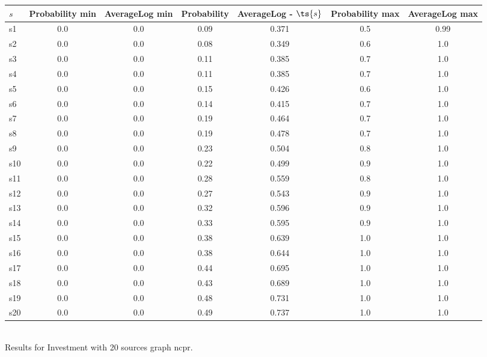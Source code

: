 \documentclass{article}
\begin{document}
\noindent\begin{tabular}{|l|c|c|c|c|c|c|}
\hline
$s$& Probability min & AverageLog min & Probability & AverageLog - $\ts{s}$ & Probability max & AverageLog max\\
\hline
s1 &0.0 & 0.0 & 0.09 & 0.371 & 0.5 & 0.99\\
\hline
s2 &0.0 & 0.0 & 0.08 & 0.349 & 0.6 & 1.0\\
\hline
s3 &0.0 & 0.0 & 0.11 & 0.385 & 0.7 & 1.0\\
\hline
s4 &0.0 & 0.0 & 0.11 & 0.385 & 0.7 & 1.0\\
\hline
s5 &0.0 & 0.0 & 0.15 & 0.426 & 0.6 & 1.0\\
\hline
s6 &0.0 & 0.0 & 0.14 & 0.415 & 0.7 & 1.0\\
\hline
s7 &0.0 & 0.0 & 0.19 & 0.464 & 0.7 & 1.0\\
\hline
s8 &0.0 & 0.0 & 0.19 & 0.478 & 0.7 & 1.0\\
\hline
s9 &0.0 & 0.0 & 0.23 & 0.504 & 0.8 & 1.0\\
\hline
s10 &0.0 & 0.0 & 0.22 & 0.499 & 0.9 & 1.0\\
\hline
s11 &0.0 & 0.0 & 0.28 & 0.559 & 0.8 & 1.0\\
\hline
s12 &0.0 & 0.0 & 0.27 & 0.543 & 0.9 & 1.0\\
\hline
s13 &0.0 & 0.0 & 0.32 & 0.596 & 0.9 & 1.0\\
\hline
s14 &0.0 & 0.0 & 0.33 & 0.595 & 0.9 & 1.0\\
\hline
s15 &0.0 & 0.0 & 0.38 & 0.639 & 1.0 & 1.0\\
\hline
s16 &0.0 & 0.0 & 0.38 & 0.644 & 1.0 & 1.0\\
\hline
s17 &0.0 & 0.0 & 0.44 & 0.695 & 1.0 & 1.0\\
\hline
s18 &0.0 & 0.0 & 0.43 & 0.689 & 1.0 & 1.0\\
\hline
s19 &0.0 & 0.0 & 0.48 & 0.731 & 1.0 & 1.0\\
\hline
s20 &0.0 & 0.0 & 0.49 & 0.737 & 1.0 & 1.0\\
\hline
\end{tabular}\\

\noindent Results for Investment with 20 sources graph ncpr.
\end{document}

